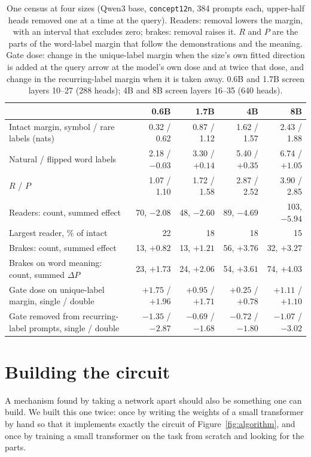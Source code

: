 \documentclass{article}
\begin{document}
\begin{table}[t]\centering\small
\caption{One census at four sizes (Qwen3 base, \texttt{concept12n}, 384 prompts each, upper-half heads removed one at a time at the query). Readers: removal lowers the margin, with an interval that excludes zero; brakes: removal raises it. $R$ and $P$ are the parts of the word-label margin that follow the demonstrations and the meaning. Gate dose: change in the unique-label margin when the size's own fitted direction is added at the query arrow at the model's own dose and at twice that dose, and change in the recurring-label margin when it is taken away. 0.6B and 1.7B screen layers 10--27 (288 heads); 4B and 8B screen layers 16--35 (640 heads).}\label{tab:scale}
\begin{tabularx}{\linewidth}{Yrrrr}
\toprule
 & 0.6B & 1.7B & 4B & 8B \\
\midrule
Intact margin, symbol / rare labels (nats) & 0.32 / 0.62 & 0.87 / 1.12 & 1.62 / 1.57 & 2.43 / 1.88 \\
Natural / flipped word labels & 2.18 / $-0.03$ & 3.30 / $+0.14$ & 5.40 / $+0.35$ & 6.74 / $+1.05$ \\
$R$ / $P$ & 1.07 / 1.10 & 1.72 / 1.58 & 2.87 / 2.52 & 3.90 / 2.85 \\
Readers: count, summed effect & 70, $-2.08$ & 48, $-2.60$ & 89, $-4.69$ & 103, $-5.94$ \\
Largest reader, \% of intact & 22 & 18 & 18 & 15 \\
Brakes: count, summed effect & 13, $+0.82$ & 13, $+1.21$ & 56, $+3.76$ & 32, $+3.27$ \\
Brakes on word meaning: count, summed $\Delta P$ & 23, $+1.73$ & 24, $+2.06$ & 54, $+3.61$ & 74, $+4.03$ \\
Gate dose on unique-label margin, single / double & $+1.75$ / $+1.96$ & $+0.95$ / $+1.71$ & $+0.25$ / $+0.78$ & $+1.11$ / $+1.10$ \\
Gate removed from recurring-label prompts, single / double & $-1.35$ / $-2.87$ & $-0.69$ / $-1.68$ & $-0.72$ / $-1.80$ & $-1.07$ / $-3.02$ \\
\bottomrule
\end{tabularx}
\end{table}

\section{Building the circuit}\label{sec:build}
A mechanism found by taking a network apart should also be something one can build. We built this one twice: once by writing the weights of a small transformer by hand so that it implements exactly the circuit of Figure~\ref{fig:algorithm}, and once by training a small transformer on the task from scratch and looking for the parts.
\end{document}
